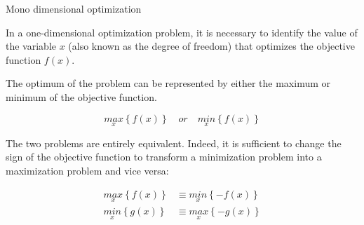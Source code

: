 \documentclass[xcolor={dvipsnames,rgb}, aspectratio=169]{beamer}
\begin{document}
\begin{frame}{Mono dimensional optimization}
   \footnotesize{
      In a one-dimensional optimization problem, it is necessary to identify the value of
      the variable $x$ (also known as the degree of freedom) that optimizes the objective
      function $f(x)$.

      The optimum of the problem can be represented by either the maximum or minimum of
      the objective function.

      \begin{equation*}
         \underset{x}{max} \left\{f(x)\right\} \quad or \quad \underset{x}{min}
         \left\{f(x)\right\}
      \end{equation*}

      The two problems are entirely equivalent. Indeed, it is sufficient to change the
      sign of the objective function to transform a minimization problem into a
      maximization problem and vice versa:

      \begin{align*}
         \underset{x}{max} \left\{f(x)\right\} &\equiv \underset{x}{min}
         \left\{-f(x)\right\} \\
         \underset{x}{min} \left\{g(x)\right\} &\equiv \underset{x}{max}
         \left\{-g(x)\right\}
      \end{align*}
   }
\end{frame}
\end{document}
